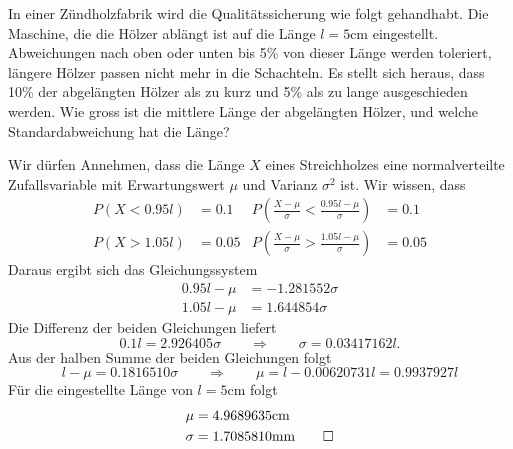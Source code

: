 In einer Zündholzfabrik wird die Qualitätssicherung wie folgt gehandhabt.
Die Maschine, die die Hölzer ablängt ist auf die Länge $l=5\text{cm}$ eingestellt.
Abweichungen nach oben oder unten bis 5\% von dieser Länge werden toleriert,
längere Hölzer passen nicht mehr in die Schachteln. Es stellt sich
heraus, dass 10\% der abgelängten Hölzer als zu kurz und 5\% als zu
lange ausgeschieden werden. Wie gross ist die mittlere Länge der abgelängten
Hölzer, und welche Standardabweichung hat die Länge?

\begin{loesung}
Wir dürfen Annehmen, dass die Länge $X$ eines Streichholzes eine
normalverteilte Zufallsvariable mit Erwartungswert $\mu$ und Varianz
$\sigma^2$ ist. Wir wissen, dass
\begin{align*}
P(X<0.95 l)&=0.1&P\left(\frac{X-\mu}{\sigma}<\frac{0.95l-\mu}{\sigma}\right)&=0.1\\
P(X>1.05l)&=0.05&P\left(\frac{X-\mu}{\sigma}>\frac{1.05l-\mu}{\sigma}\right)&=0.05
\end{align*}
Daraus ergibt sich das Gleichungssystem
\begin{align*}
0.95l-\mu&=-1.281552\sigma\\
1.05l-\mu&=1.644854\sigma
\end{align*}
Die Differenz der beiden Gleichungen liefert
\[
0.1l=2.926405\sigma\qquad\Rightarrow\qquad
\sigma=0.03417162l.
\]
Aus der halben Summe der beiden Gleichungen folgt
\[
l-\mu=0.1816510\sigma\qquad\Rightarrow\qquad\mu=l-0.00620731l
=0.9937927l
\]
Für die eingestellte Länge von $l=5\text{cm}$ folgt
\begin{align*}
\mu&=
4.9689635
\text{cm}
\\
\sigma&=
1.7085810
\text{mm}
\qedhere
\end{align*}
\end{loesung}

